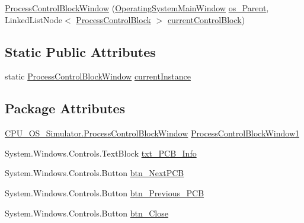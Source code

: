 \begin{DoxyCompactItemize}
\item 
\hyperlink{class_c_p_u___o_s___simulator_1_1_process_control_block_window_a79535cb1f910910d3cd9d896b7dd9fbc}{Process\+Control\+Block\+Window} (\hyperlink{class_c_p_u___o_s___simulator_1_1_operating_system_main_window}{Operating\+System\+Main\+Window} \hyperlink{class_c_p_u___o_s___simulator_1_1_process_control_block_window_acc4b72c5370a2bcda85b16e0801ce3d9}{os\+\_\+\+Parent}, Linked\+List\+Node$<$ \hyperlink{class_c_p_u___o_s___simulator_1_1_operating___system_1_1_process_control_block}{Process\+Control\+Block} $>$ \hyperlink{class_c_p_u___o_s___simulator_1_1_process_control_block_window_a6019633d26586b0df1c4c2d6f008f6c9}{current\+Control\+Block})
\end{DoxyCompactItemize}
\subsection*{Static Public Attributes}
\begin{DoxyCompactItemize}
\item 
static \hyperlink{class_c_p_u___o_s___simulator_1_1_process_control_block_window}{Process\+Control\+Block\+Window} \hyperlink{class_c_p_u___o_s___simulator_1_1_process_control_block_window_a88bea947f074426da083add43be70d48}{current\+Instance}
\end{DoxyCompactItemize}
\subsection*{Package Attributes}
\begin{DoxyCompactItemize}
\item 
\hyperlink{class_c_p_u___o_s___simulator_1_1_process_control_block_window}{C\+P\+U\+\_\+\+O\+S\+\_\+\+Simulator.\+Process\+Control\+Block\+Window} \hyperlink{class_c_p_u___o_s___simulator_1_1_process_control_block_window_a0f63765fb81d298b85ac605be61d06ca}{Process\+Control\+Block\+Window1}
\item 
System.\+Windows.\+Controls.\+Text\+Block \hyperlink{class_c_p_u___o_s___simulator_1_1_process_control_block_window_af88f289c3eba55631106b52e491fa137}{txt\+\_\+\+P\+C\+B\+\_\+\+Info}
\item 
System.\+Windows.\+Controls.\+Button \hyperlink{class_c_p_u___o_s___simulator_1_1_process_control_block_window_a5cdb1a1e4c4351ab1c153309cd15969e}{btn\+\_\+\+Next\+P\+C\+B}
\item 
System.\+Windows.\+Controls.\+Button \hyperlink{class_c_p_u___o_s___simulator_1_1_process_control_block_window_af25ab71dad636514e08f3e8839b04727}{btn\+\_\+\+Previous\+\_\+\+P\+C\+B}
\item 
System.\+Windows.\+Controls.\+Button \hyperlink{class_c_p_u___o_s___simulator_1_1_process_control_block_window_abbfd6b98c1cf8a76437639b1b43859e3}{btn\+\_\+\+Close}
\end{DoxyCompactItemize}
